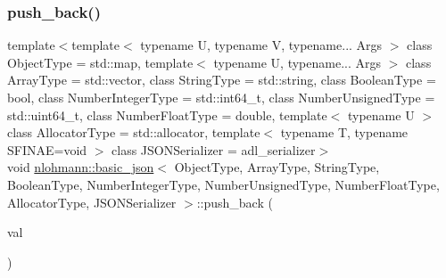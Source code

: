\mbox{\label{classnlohmann_1_1basic__json_ab4384af330b79de0e5f279576803a2c7}} 
\subsubsection{\texorpdfstring{push\_back()}{push\_back()}\hspace{0.1cm}{\footnotesize\ttfamily [2/4]}}
{\footnotesize\ttfamily template$<$template$<$ typename U, typename V, typename... Args $>$ class Object\+Type = std\+::map, template$<$ typename U, typename... Args $>$ class Array\+Type = std\+::vector, class String\+Type  = std\+::string, class Boolean\+Type  = bool, class Number\+Integer\+Type  = std\+::int64\+\_\+t, class Number\+Unsigned\+Type  = std\+::uint64\+\_\+t, class Number\+Float\+Type  = double, template$<$ typename U $>$ class Allocator\+Type = std\+::allocator, template$<$ typename T, typename S\+F\+I\+N\+A\+E=void $>$ class J\+S\+O\+N\+Serializer = adl\+\_\+serializer$>$ \\
void \mbox{\hyperlink{classnlohmann_1_1basic__json}{nlohmann\+::basic\+\_\+json}}$<$ Object\+Type, Array\+Type, String\+Type, Boolean\+Type, Number\+Integer\+Type, Number\+Unsigned\+Type, Number\+Float\+Type, Allocator\+Type, J\+S\+O\+N\+Serializer $>$\+::push\+\_\+back (\begin{DoxyParamCaption}\item[{const \mbox{\hyperlink{classnlohmann_1_1basic__json}{basic\+\_\+json}}$<$ Object\+Type, Array\+Type, String\+Type, Boolean\+Type, Number\+Integer\+Type, Number\+Unsigned\+Type, Number\+Float\+Type, Allocator\+Type, J\+S\+O\+N\+Serializer $>$ \&}]{val }\end{DoxyParamCaption})\hspace{0.3cm}{\ttfamily [inline]}}



